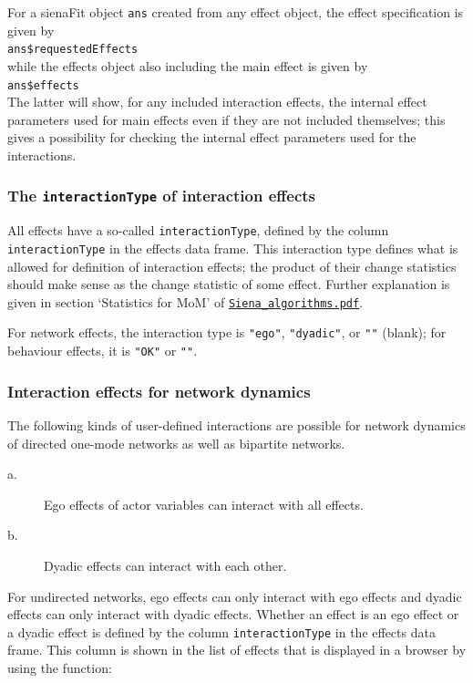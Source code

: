 \documentclass[a4paper,fleqn,11pt]{article}
\newcommand{\+}{\, + \,}
\newcommand{\sfn}[1]{\textsf{#1}}
\begin{document}
For a \sfn{sienaFit} object \texttt{ans} created from any effect object,
the effect specification is given by\\[0.3em]
\texttt{ans\$requestedEffects}\\[0.3em]
while the effects object also including the main effect is given by\\[0.3em]
\texttt{ans\$effects}\\[0.3em]
The latter will show, for any included interaction effects,
the internal effect parameters used for main effects
even if they are not included themselves; this gives
a possibility for checking the internal effect parameters
used for the interactions.


\subsubsection{The \texttt{interactionType} of interaction effects}

All effects have a so-called  \texttt{interactionType},
defined by the column \texttt{interactionType} in the effects data frame.
This interaction type defines what is allowed for  definition of interaction effects;
the product of their change statistics should make sense as the change
statistic of some effect.
Further explanation is given in section `Statistics for MoM' of
\href{http://www.stats.ox.ac.uk/~snijders/siena/Siena_algorithms.pdf}{\texttt{Siena\_algorithms.pdf}}.

For network effects, the interaction type is \texttt{"ego"}, \texttt{"dyadic"},
or \texttt{""} (blank);
for behaviour effects, it is \texttt{"OK"} or \texttt{""}.


\subsubsection{Interaction effects for network dynamics}
\label{S_intnet}

The following kinds of user-defined interactions are possible
for network dynamics of directed one-mode networks
as well as bipartite networks.
\begin{description}
\item[a.]
  Ego effects of actor variables can interact with all effects.
  \item[b.] Dyadic effects can interact with each other.
\end{description}
For undirected networks, ego effects can only interact with ego effects and
dyadic effects can only interact with dyadic effects.
Whether an effect is an ego effect or a dyadic effect is defined by
the column \texttt{interactionType} in the effects data frame.
This column is shown in the list of effects that is displayed
in a browser by using the function:
\end{document}
